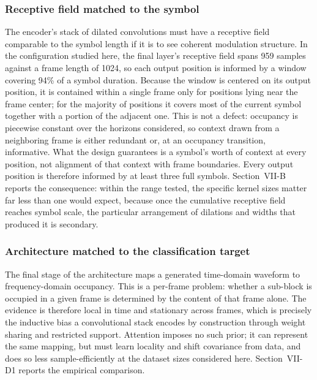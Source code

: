 \documentclass[lettersize,journal]{IEEEtran}
\begin{document}
\subsubsection{\textbf{Receptive field matched to the symbol}}
\label{sec:receptive}
The encoder's stack of dilated convolutions must have a receptive field
comparable to the symbol length if it is to see coherent modulation structure.
In the configuration studied here, the final layer's receptive field spans 959
samples against a frame length of 1024, so each output position is informed by a
window covering 94\% of a symbol duration. Because the window is centered on its
output position, it is contained within a single frame only for positions lying
near the frame center; for the majority of positions it covers most of the
current symbol together with a portion of the adjacent one. This is not a
defect: occupancy is piecewise constant over the horizons considered, so
context drawn from a neighboring frame is either redundant or, at an occupancy
transition, informative. What the design guarantees is a symbol's worth of
context at every position, not alignment of that context with frame boundaries.
Every output position is therefore informed by at least three full symbols.
Section~VII-B reports the consequence: within the range
tested, the specific kernel sizes matter far less than one would expect, because
once the cumulative receptive field reaches symbol scale, the particular
arrangement of dilations and widths that produced it is secondary.

\subsubsection{\textbf{Architecture matched to the classification target}}
\label{sec:ablation_head}
The final stage of the architecture maps a generated time-domain waveform to
frequency-domain occupancy. This is a per-frame problem: whether a sub-block is
occupied in a given frame is determined by the content of that frame alone. The
evidence is therefore local in time and stationary across frames, which is
precisely the inductive bias a convolutional stack encodes by construction
through weight sharing and restricted support. Attention imposes no such prior;
it can represent the same mapping, but must learn locality and shift covariance
from data, and does so less sample-efficiently at the dataset sizes considered
here. Section~VII-D1 reports the empirical comparison.
\end{document}
